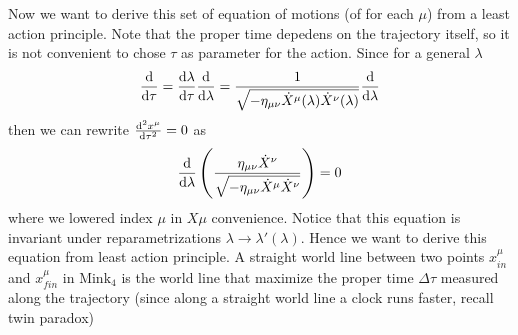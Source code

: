 \documentclass[../main/main.tex]{subfiles}
\begin{document}
Now we want to derive this set of equation of motions (of for each $\mu$) from a least action principle. Note that the proper time depedens on the trajectory itself, so it is not convenient to chose $\tau$ as parameter for the action. 
Since for a general $\lambda$
\begin{equation}\label{eqn:tau-lambda-relation}
\frac{\textup{d}}{\textup{d}\tau}=\frac{\textup{d}\lambda}{\textup{d}\tau}\frac{\textup{d}}{\textup{d}\lambda}=\frac1{\sqrt{-\eta_{\mu\nu}\dot X^\mu(\lambda)\dot X^\nu(\lambda)}}\frac{\textup{d}}{\textup{d}\lambda}
\end{equation}
then we can rewrite $\frac{\textup{d}^2 x^\mu}{\textup{d} \tau^2}=0$ as 
\begin{equation}
\frac{\textup{d}}{\textup{d}\lambda}\left(\frac{\eta_{\mu\nu}\dot X^\nu}{\sqrt{-\eta_{\mu\nu}\dot X^\mu\dot X^\nu}}\right)=0
\end{equation}
where we lowered index $\mu$ in $X\mu$ convenience. Notice that this equation is invariant under reparametrizations $\lambda\to\lambda'(\lambda)$.
Hence we want to derive this equation from least action principle. A straight world line between two points $x_{in}^\mu$ and $x_{fin}^\mu$ in $\text{Mink}_4$ is the world line that maximize the proper time $\Delta \tau$ measured along the trajectory (since along a straight world line a clock runs faster, recall twin paradox)
\end{document}

